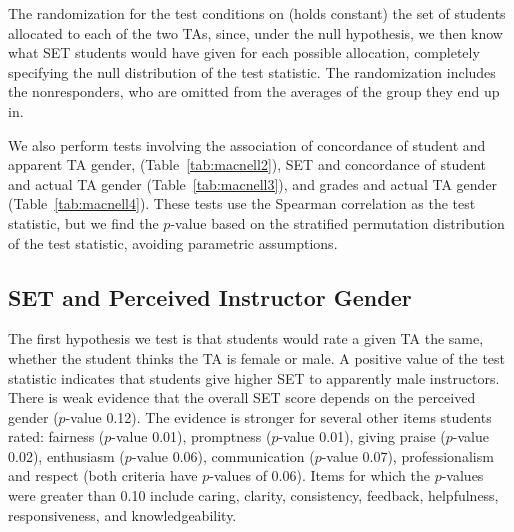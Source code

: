 \documentclass[12pt]{article}
\newcommand{\todo}[1]{{\color{red}{TO DO: \sc #1}}}
\begin{document}
The randomization for the test conditions on (holds constant) the set of students 
allocated to each of the two TAs, since, under the null hypothesis, we then know what 
SET students would have given for each possible allocation, completely specifying the
null distribution of the test statistic.
The randomization includes the nonresponders, who are omitted from the averages of the
group they end up in.

We also perform tests involving the association of concordance of student and apparent TA
gender,
(Table~\ref{tab:macnell2}), SET and concordance of student and actual TA gender 
(Table~\ref{tab:macnell3}), and grades and actual TA gender (Table~\ref{tab:macnell4}).  
These tests use the Spearman correlation as the test statistic, but we find the $p$-value
based on the stratified permutation distribution of the test statistic, avoiding
parametric assumptions.

\subsection{SET and Perceived Instructor Gender}
\todo{make sure the category names make sense in the prose}
The first hypothesis we test is that students would rate a given TA the same,
whether the student thinks the TA is female or male. 
A positive value of the test statistic indicates that students give higher SET
to apparently male instructors.
There is weak evidence that the overall SET score depends on the perceived gender ($p$-value 0.12). 
The evidence is stronger for several other items students rated: fairness ($p$-value 0.01), 
promptness ($p$-value 0.01), giving praise ($p$-value 0.02), 
enthusiasm ($p$-value 0.06), communication ($p$-value 0.07), professionalism and respect (both criteria have $p$-values of 0.06). 
Items for which the $p$-values were greater than 0.10 include caring, clarity,
consistency, feedback, helpfulness, responsiveness, and knowledgeability.
\end{document}
